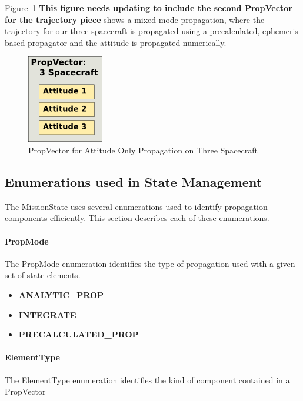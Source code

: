 Figure~\ref{figure:AttitudePropVector} \textbf{This figure needs updating to include the second
PropVector for the trajectory piece} shows a mixed mode propagation, where the trajectory for our
three spacecraft is propagated using a precalculated, ephemeris based propagator and the attitude is
propagated numerically.

\begin{figure}[htb]
\begin{center}
\includegraphics[63,73]{Images/ThreeSatAttitudePropVector.png}
\caption{\label{figure:AttitudePropVector}PropVector for Attitude Only Propagation on Three
Spacecraft}
\end{center}
\end{figure}


\subsection{Enumerations used in State Management}

The MissionState uses several enumerations used to identify propagation components efficiently.
This section describes each of these enumerations.

\paragraph{PropMode}  The PropMode enumeration identifies the type of propagation used with a given
set of state elements.

\begin{itemize}
\item \textbf{ANALYTIC\_PROP}
\item \textbf{INTEGRATE}
\item \textbf{PRECALCULATED\_PROP}
\end{itemize}

\paragraph{ElementType}  The ElementType enumeration identifies the kind of component contained in
a PropVector

